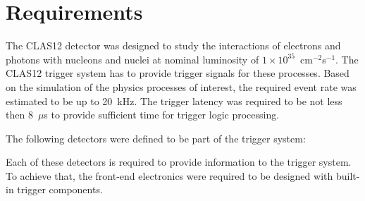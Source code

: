 \section{Requirements}

The CLAS12 detector was designed to study the interactions of electrons and photons with nucleons and nuclei at nominal luminosity of $1\times 10^{35}$~cm$^{-2}$s$^{-1}$. The CLAS12 trigger system has to provide trigger signals for these processes. Based on the simulation of the physics processes of interest, the required event rate was estimated to be up to 20~kHz. The trigger latency was required to be not less then 8~$\mu$s to provide sufficient time for trigger logic processing.


The following detectors were defined to be part of the trigger system:


Each of these detectors is required to provide information to the trigger system. To achieve that, the front-end electronics were required to be designed with built-in trigger components. 

 
